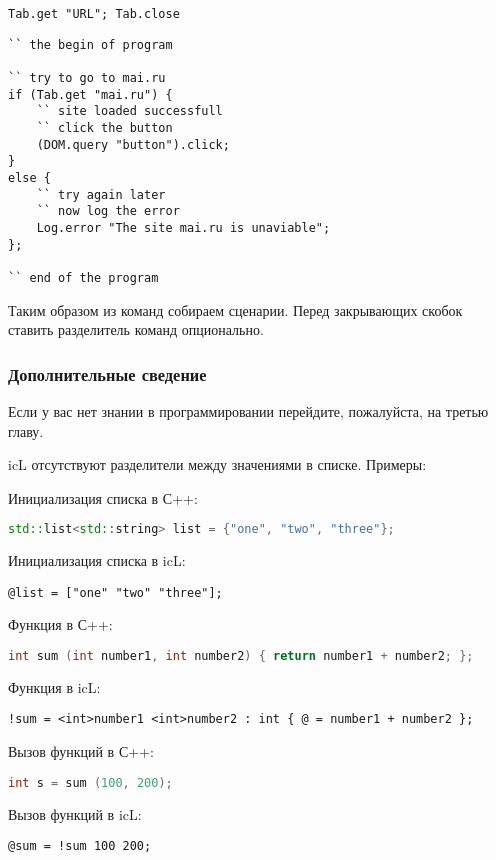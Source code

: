 \begin{lstlisting}[numbers=none]
Tab.get "URL"; Tab.close
\end{lstlisting}

\begin{lstlisting}[caption=Koд с пробельных символов,label=readable]
`` the begin of program

`` try to go to mai.ru
if (Tab.get "mai.ru") {
	`` site loaded successfull
	`` click the button
	(DOM.query "button").click;
}
else {
	`` try again later
	`` now log the error
	Log.error "The site mai.ru is unaviable";
};

`` end of the program
\end{lstlisting}

Таким образом из команд собираем сценарии. Перед закрывающих скобок ставить разделитель команд опционально.

\subsubsection{Дополнительные сведение}

Если у вас нет знании в программировании перейдите, пожалуйста, на третью главу.

icL отсутствуют разделители между значениями в списке. Примеры:

\begin{icItems}
	\item Инициализация списка в С++:
\begin{lstlisting}[numbers=none, language=C++]
std::list<std::string> list = {"one", "two", "three"};
\end{lstlisting}
	Инициализация списка в icL:
\begin{lstlisting}[numbers=none]
@list = ["one" "two" "three"];
\end{lstlisting}
	\item Функция в С++:
\begin{lstlisting}[numbers=none, language=C++]
int sum (int number1, int number2) { return number1 + number2; };
\end{lstlisting}
	Функция в icL:
\begin{lstlisting}[numbers=none]
!sum = <int>number1 <int>number2 : int { @ = number1 + number2 };
\end{lstlisting}
	\item Вызов функций в С++:
\begin{lstlisting}[numbers=none, language=C++]
int s = sum (100, 200);
\end{lstlisting}
	Вызов функций в icL:
\begin{lstlisting}[numbers=none]
@sum = !sum 100 200;
\end{lstlisting}
\end{icItems}
